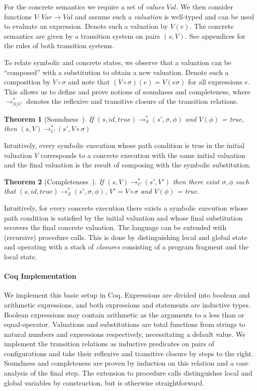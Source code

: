 \documentclass[submission,copyright,creativecommons]{eptcs}
\newtheorem{theorem}{Theorem}
\begin{document}
For the concrete semantics we require a set of \emph{values} $Val$. We then consider functions $V : Var \rightarrow Val$
and assume such a \emph{valuation} is well-typed and can be used to evaluate an expression. Denote such a valuation by $V(e)$.
The concrete semantics are given by a transition system on pairs $(s, V)$.
See appendices for the rules of both transition systems.

To relate symbolic and concrete states, we observe that a valuation can be ``composed'' with a substitution
to obtain a new valuation. Denote such a composition by $V \circ \sigma$ and note that $(V \circ \sigma)(e) = V(e\sigma)$
for all expressions $e$.
This allows us to define and prove notions of soundness and completeness,
where $\rightarrow_{S/C}^{*}$ denotes the reflexive and transitive closure of the transition relations.
\begin{theorem}[Soundness~{\cite{boer2021}}]
  If $(s, id, true) \rightarrow_{S}^{*} (s', \sigma, \phi)$ and $V(\phi)$ = true,
  then $(s, V) \rightarrow_{C}^{*} (s', V \circ \sigma)$
\end{theorem}
Intuitively, every symbolic execution whose path condition is true in the initial valuation $V$
corresponds to a concrete execution with the same initial valuation and the final valuation is
the result of composing with the symbolic substitution.
\begin{theorem}[Completeness~{\cite{boer2021}}]
  If $(s, V) \rightarrow_{C}^{*} (s', V')$ then there exist $\sigma, \phi$ such that
  $(s, id, true) \rightarrow_{S}^{*} (s', \sigma, \phi)$, $V' = V \circ \sigma$ and $V(\phi)$ = true.
\end{theorem}
Intuitively, for every concrete execution there exists a symbolic execution whose path condition
is satisfied by the initial valuation and whose final substitution recovers the final concrete valuation.
The language can be extended with (recursive) procedure calls.
This is done by distinguishing local and global state and operating with a stack of \emph{closures} consisting
of a program fragment and the local state.
\paragraph{Coq Implementation}
We implement this basic setup in Coq. Expressions are divided into boolean and arithmetic expressions,
and both expressions and statements are inductive types. Boolean expressions may contain arithmetic as the
arguments to a less than or equal-operator.
Valuations and substitutions are total functions from strings to natural numbers and expressions respectively,
necessitating a default value.
We implement the transition relations as inductive predicates on pairs of configurations and take their
reflexive and transitive closure by steps to the right.
Soundness and completeness are proven by induction on this relation and a case analysis of the final step.
The extension to procedure calls distinguishes local and global variables by construction, but is
otherwise straightforward.
\end{document}

